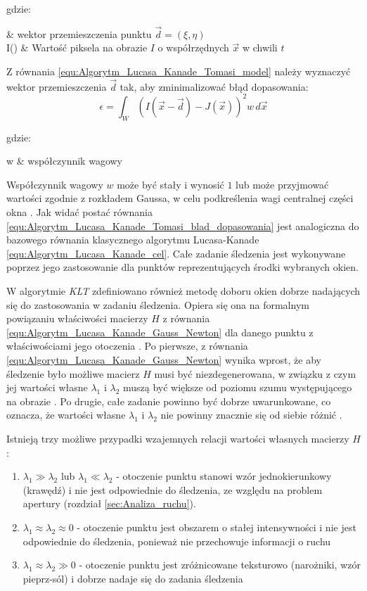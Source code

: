 \noindent
gdzie:
\begin{conditions}
	 & wektor przemieszczenia punktu $\vec{d} = (\xi, \eta)$ \\
	I() & Wartość piksela na obrazie $I$ o współrzędnych $\vec{x}$ w chwili $t$ \\
\end{conditions}

Z równania \ref{equ:Algorytm_Lucasa_Kanade_Tomasi_model} należy wyznaczyć wektor przemieszczenia $\vec{d}$ tak, aby zminimalizować błąd dopasowania:
\begin{equation}
\label{equ:Algorytm_Lucasa_Kanade_Tomasi_blad_dopasowania}
	\epsilon = \int_W (I(\vec{x} - \vec{d}) - J(\vec{x}))^2 w \, d\vec{x}
\end{equation}

\noindent
gdzie:
\begin{conditions}
	w & współczynnik wagowy \\
\end{conditions}

Współczynnik wagowy $w$ może być stały i wynosić $1$ lub może przyjmować wartości zgodnie z rozkładem Gaussa, w celu podkreślenia wagi centralnej części okna \cite{Tomasi1991}. Jak widać postać równania \ref{equ:Algorytm_Lucasa_Kanade_Tomasi_blad_dopasowania} jest analogiczna do bazowego równania klasycznego algorytmu Lucasa-Kanade \ref{equ:Algorytm_Lucasa_Kanade_cel}. Całe zadanie śledzenia jest wykonywane poprzez jego zastosowanie dla punktów reprezentujących środki wybranych okien.

W algorytmie \textit{KLT} zdefiniowano również metodę doboru okien dobrze nadających się do zastosowania w zadaniu śledzenia. Opiera się ona na formalnym powiązaniu właściwości macierzy $H$ z równania \ref{equ:Algorytm_Lucasa_Kanade_Gauss_Newton} dla danego punktu z właściwościami jego otoczenia \cite{Tomasi1991}. Po pierwsze, z równania \ref{equ:Algorytm_Lucasa_Kanade_Gauss_Newton} wynika wprost, że aby śledzenie było możliwe macierz $H$ musi być niezdegenerowana, w związku z czym jej wartości własne $\lambda_1$ i $\lambda_2$ muszą być większe od poziomu szumu występującego na obrazie \cite{Tomasi1991}. Po drugie, całe zadanie powinno być dobrze uwarunkowane, co oznacza, że wartości własne $\lambda_1$ i $\lambda_2$ nie powinny znacznie się od siebie różnić \cite{Tomasi1991}.

Istnieją trzy możliwe przypadki wzajemnych relacji wartości własnych macierzy $H$:
\begin{enumerate}
	\item $\lambda_1 \gg \lambda_2$ lub $\lambda_1 \ll \lambda_2$ - otoczenie punktu stanowi wzór jednokierunkowy (krawędź) i nie jest odpowiednie do śledzenia, ze względu na problem apertury (rozdział \ref{sec:Analiza_ruchu}).
	\item $\lambda_1 \approx \lambda_2 \approx 0$ - otoczenie punktu jest obszarem o stałej intensywności i nie jest odpowiednie do śledzenia, ponieważ  nie przechowuje informacji o ruchu
	\item $\lambda_1 \approx \lambda_2 \gg 0$ - otoczenie punktu jest zróżnicowane teksturowo (narożniki, wzór pieprz-sól) i dobrze nadaje się do zadania śledzenia
\end{enumerate}

